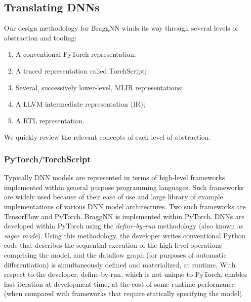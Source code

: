 \subsection{Translating DNNs}\label{subsec:translatingdnns}
Our design methodology for BraggNN winds its way through several levels of abstraction and tooling:

\begin{enumerate}
	\item A conventional PyTorch representation;
	\item A traced representation called TorchScript;
	\item Several, successively lower-level, MLIR representations;
	\item A LLVM intermediate representation (IR);
	\item A RTL representation.
\end{enumerate}

We quickly review the relevant concepts of each level of abstraction.

\subsubsection{PyTorch/TorchScript}\label{subsec:pytorch}

Typically DNN models are represented in terms of high-level frameworks implemented within general purpose programming languages.
Such frameworks are widely used because of their ease of use and large library of example implementations of various DNN model architectures.
Two such frameworks are TensorFlow and PyTorch.
BraggNN is implemented within PyTorch.
DNNs are developed within PyTorch using the \emph{define-by-run} methodology (also known as \emph{eager mode}).
Using this methodology, the developer writes conventional Python code that describes the sequential execution of the high-level operations comprising the model, and the dataflow graph (for purposes of automatic differentiation) is simultaneously defined and materialized, at runtime.
With respect to the developer, define-by-run, which is not unique to PyTorch, enables fast iteration at development time, at the cost of some runtime performance (when compared with frameworks that require statically specifying the model).

